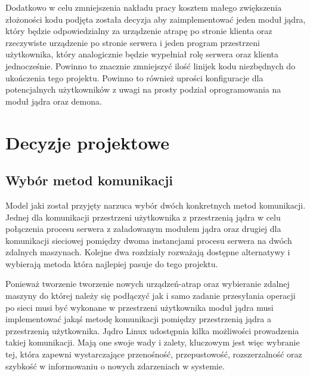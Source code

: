 \documentclass[10pt]{article}
\begin{document}
Dodatkowo w celu zmniejszenia nakładu pracy kosztem małego zwiększenia
złożoności kodu podjęta została decyzja aby zaimplementować jeden moduł
jądra, który będzie odpowiedzialny za urządzenie atrapę po stronie
klienta oraz rzeczywiste urządzenie po stronie serwera i jeden program
przestrzeni użytkownika, który analogicznie będzie wypełniał rolę
serwera oraz klienta jednocześnie. Powinno to znacznie zmniejszyć ilość
linijek kodu niezbędnych do ukończenia tego projektu. Powinno to również
uprości konfiguracje dla potencjalnych użytkowników z uwagi na prosty
podział oprogramowania na moduł jądra oraz demona.

\section{Decyzje projektowe}

\subsection{Wybór metod komunikacji}

Model jaki został przyjęty narzuca wybór dwóch konkretnych metod
komunikacji. Jednej dla komunikacji przestrzeni użytkownika z
przestrzenią jądra w celu połączenia procesu serwera z załadowanym
modułem jądra oraz drugiej dla komunikacji sieciowej pomiędzy dwoma
instancjami procesu serwera na dwóch zdalnych maszynach. Kolejne dwa
rozdziały rozważają dostępne alternatywy i wybierają metoda która
najlepiej pasuje do tego projektu.


Ponieważ tworzenie tworzenie nowych urządzeń-atrap oraz wybieranie
zdalnej maszyny do której należy się podłączyć jak i samo zadanie
przesyłania operacji po sieci musi być wykonane w przestrzeni
użytkownika moduł jądra musi implementować jakąś metodę komunikacji
pomiędzy przestrzenią jądra a przestrzenią użytkownika. Jądro Linux
udostępnia kilka możliwości prowadzenia takiej komunikacji. Mają one
swoje wady i zalety, kluczowym jest więc wybranie tej, która zapewni
wystarczające przenośność, przepustowość, rozszerzalność oraz szybkość w
informowaniu o nowych zdarzeniach w systemie.
\end{document}
